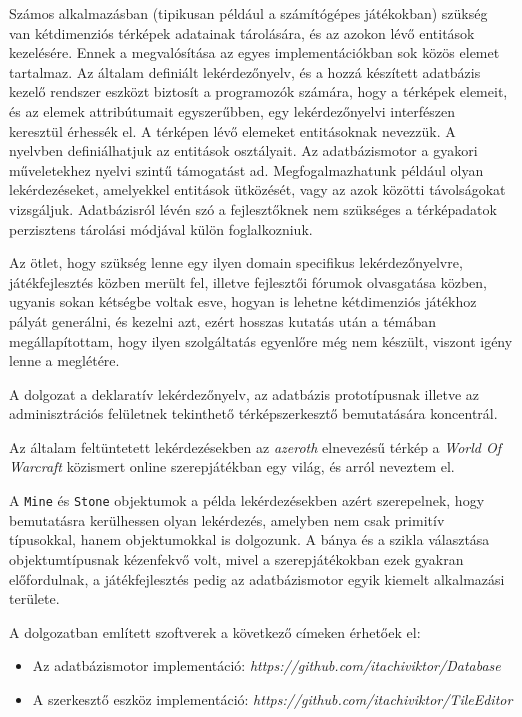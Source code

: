
Számos alkalmazásban (tipikusan például a számítógépes játékokban) szükség  van kétdimenziós térképek adatainak tárolására, és az azokon lévő entitások kezelésére. Ennek a megvalósítása az egyes implementációkban sok közös elemet tartalmaz. Az általam definiált lekérdezőnyelv, és a hozzá készített adatbázis kezelő rendszer eszközt biztosít a programozók számára, hogy a térképek elemeit, és az elemek attribútumait egyszerűbben, egy lekérdezőnyelvi interfészen keresztül érhessék el. A térképen lévő elemeket entitásoknak nevezzük. A nyelvben definiálhatjuk az entitások osztályait. Az adatbázismotor a gyakori műveletekhez nyelvi szintű támogatást ad. Megfogalmazhatunk például olyan lekérdezéseket, amelyekkel entitások ütközését, vagy az azok közötti távolságokat vizsgáljuk. Adatbázisról lévén szó a fejlesztőknek nem szükséges a térképadatok perzisztens tárolási módjával külön foglalkozniuk.

Az ötlet, hogy szükség lenne egy ilyen domain specifikus lekérdezőnyelvre, játékfejlesztés közben merült fel, illetve fejlesztői fórumok olvasgatása közben, ugyanis sokan kétségbe voltak esve, hogyan is lehetne kétdimenziós játékhoz pályát generálni, és kezelni azt, ezért hosszas kutatás után a témában megállapítottam, hogy ilyen szolgáltatás egyenlőre még nem készült, viszont igény lenne a meglétére.

A dolgozat a deklaratív lekérdezőnyelv, az adatbázis prototípusnak illetve az adminisztrációs felületnek tekinthető térképszerkesztő bemutatására koncentrál.

Az általam feltüntetett lekérdezésekben az \textit{azeroth} elnevezésű térkép a \textit{World Of Warcraft} közismert online szerepjátékban egy világ, és arról neveztem el.

A \texttt{Mine} és \texttt{Stone} objektumok a példa lekérdezésekben azért szerepelnek, hogy bemutatásra kerülhessen olyan lekérdezés, amelyben nem csak primitív típusokkal, hanem objektumokkal is dolgozunk. A bánya és a szikla választása objektumtípusnak kézenfekvő volt, mivel a szerepjátékokban ezek gyakran előfordulnak, a játékfejlesztés pedig az adatbázismotor egyik kiemelt alkalmazási területe.

A dolgozatban említett szoftverek a következő címeken érhetőek el:
\begin{itemize}
\item Az adatbázismotor implementáció: \textit{https://github.com/itachiviktor/Database}
\item A szerkesztő eszköz implementáció: \textit{https://github.com/itachiviktor/TileEditor}
\end{itemize}

